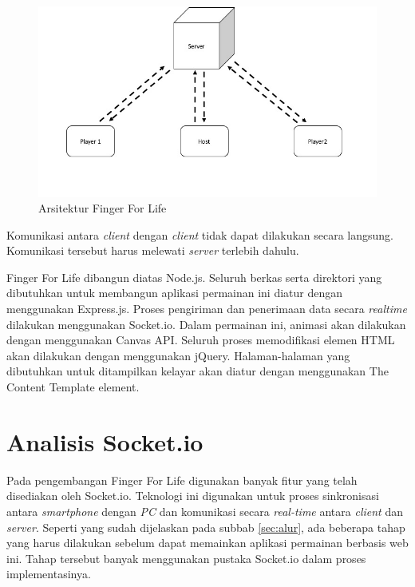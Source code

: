 \begin{figure}[H]
	\centering
	\includegraphics[scale=0.45]{Gambar/ars_fingerforlife}
	\caption{Arsitektur Finger For Life}
	\label{fig:ars_fingerforlife}
\end{figure}

Komunikasi antara \textit{client} dengan \textit{client} tidak dapat dilakukan secara langsung. Komunikasi tersebut harus melewati \textit{server} terlebih dahulu. 

Finger For Life dibangun diatas Node.js. Seluruh berkas serta direktori yang dibutuhkan untuk membangun aplikasi permainan ini diatur dengan menggunakan Express.js. Proses pengiriman dan penerimaan data secara \textit{realtime} dilakukan menggunakan Socket.io. Dalam permainan ini, animasi akan dilakukan dengan menggunakan Canvas API. Seluruh proses memodifikasi elemen HTML akan dilakukan dengan menggunakan jQuery. Halaman-halaman yang dibutuhkan untuk ditampilkan kelayar akan diatur dengan menggunakan The Content Template element.

\section{Analisis Socket.io}
Pada pengembangan Finger For Life digunakan banyak fitur yang telah disediakan oleh Socket.io. Teknologi ini digunakan untuk proses sinkronisasi antara \textit{smartphone} dengan \textit{PC} dan komunikasi secara \textit{real-time} antara \textit{client} dan \textit{server}. Seperti yang sudah dijelaskan pada subbab \ref{sec:alur}, ada beberapa tahap yang harus dilakukan sebelum dapat memainkan aplikasi permainan berbasis web ini. Tahap tersebut banyak menggunakan pustaka Socket.io dalam proses implementasinya.

